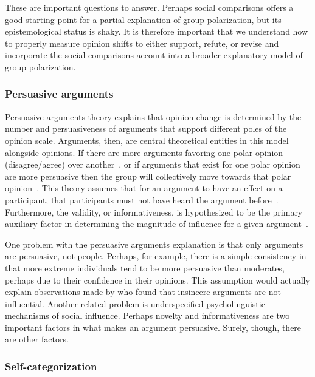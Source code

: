 These are important questions to answer. Perhaps social comparisons offers a
good starting point for a partial explanation of group polarization, but 
its epistemological status is shaky. It is therefore important that we
understand how to properly measure opinion shifts to either support,
refute, or revise and incorporate the social comparisons account into a 
broader explanatory model of group polarization.

\subsubsection{Persuasive arguments}

Persuasive arguments theory explains that opinion change is determined by the number and persuasiveness of 
arguments that support different poles of the opinion scale. Arguments, then,
are central theoretical entities in this model alongside opinions. If there are more
arguments favoring one polar opinion (disagree/agree) over another~\cite{Ebbesen1974}, or if
arguments that exist for one polar opinion are more persuasive 
then the group will collectively move towards that 
polar opinion~\cite{Vinokur1974,Burnstein1977}. This theory assumes that for an argument to have an effect
on a participant, that participants must not have heard the argument 
before~\cite[see Equation on p. 96]{Bishop1974}. Furthermore, the validity,
or informativeness, is hypothesized to be the primary auxiliary factor in 
determining the magnitude of influence for a given argument~\cite{Vinokur1978}. 

One problem with the persuasive arguments explanation is that only arguments 
are persuasive, not people. Perhaps, for example, there is a simple 
consistency in that more extreme individuals tend to be more persuasive than moderates, 
perhaps due to their confidence in their opinions. This assumption would actually 
explain observations made by  who 
found that insincere arguments are not influential.
Another related problem is underspecified
psycholinguistic mechanisms of social influence. Perhaps novelty and 
informativeness are two important factors in what makes an argument persuasive.
Surely, though, there are other factors.  

\subsubsection{Self-categorization}

